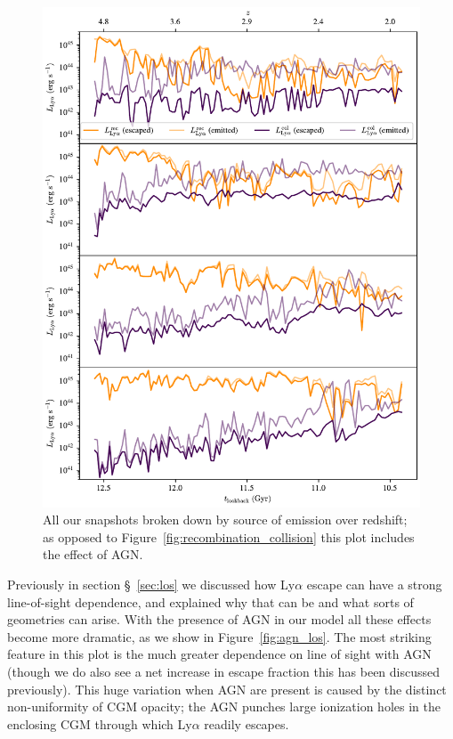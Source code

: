 \begin{figure}
    \centering
    \includegraphics[width=\textwidth,height=\textheight,keepaspectratio]{figures/agn_recombination_collision.pdf}
    \caption{
        All our snapshots broken down by source of emission over redshift; as opposed to Figure~\ref{fig:recombination_collision} this plot includes the effect of AGN.
    }
    \label{fig:agn_recombination_collision}
\end{figure}

Previously in section \S~\ref{sec:los} we discussed how Ly$\alpha$ escape can have a strong line-of-sight dependence, and explained why that can be and what sorts of geometries can arise.
With the presence of AGN in our model all these effects become more dramatic, as we show in Figure~\ref{fig:agn_los}.
The most striking feature in this plot is the much greater dependence on line of sight with AGN (though we do also see a net increase in escape fraction this has been discussed previously).
This huge variation when AGN are present is caused by the distinct non-uniformity of CGM opacity;  the AGN punches large ionization holes in the enclosing CGM through which Ly$\alpha$ readily escapes.


